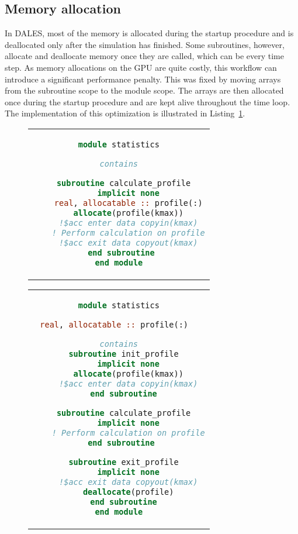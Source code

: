 \subsection{Memory allocation}
In DALES, most of the memory is allocated during the startup procedure and is deallocated only after the simulation has finished. Some subroutines, however, allocate and deallocate memory once they are called, which can be every time step. As memory allocations on the GPU are quite costly, this workflow can introduce a significant performance penalty. This was fixed by moving arrays from the subroutine scope to the module scope. The arrays are then allocated once during the startup procedure and are kept alive throughout the time loop. The implementation of this optimization is illustrated in Listing~\ref{lst:memory_allocation}.

\begin{figure}[ht]
  \centering
  \label{lst:memory_allocation}
  \begin{adjustbox}{valign=t, minipage=0.48\linewidth}
    \centering
    \begin{tabular}{c}
      \begin{lstlisting}[language=Fortran]
module statistics

contains

  subroutine calculate_profile
    implicit none
    real, allocatable :: profile(:)
    allocate(profile(kmax))
    !$acc enter data copyin(kmax)
    ! Perform calculation on profile
    !$acc exit data copyout(kmax)
  end subroutine 
end module
      \end{lstlisting}
    \end{tabular}
  \end{adjustbox}
  \hfill
  \begin{adjustbox}{valign=t, minipage=0.48\linewidth}
    \centering
    \begin{tabular}{c}
      \begin{lstlisting}[language=Fortran]
module statistics

real, allocatable :: profile(:)  

contains
  subroutine init_profile
    implicit none
    allocate(profile(kmax))
    !$acc enter data copyin(kmax)
  end subroutine

  subroutine calculate_profile
    implicit none
    ! Perform calculation on profile
  end subroutine 

  subroutine exit_profile
    implicit none
    !$acc exit data copyout(kmax)
    deallocate(profile)
  end subroutine
end module
      \end{lstlisting}
    \end{tabular}
  \end{adjustbox}
\end{figure}

